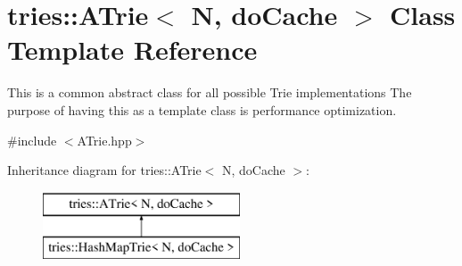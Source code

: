\hypertarget{classtries_1_1_a_trie}{}\section{tries\+:\+:A\+Trie$<$ N, do\+Cache $>$ Class Template Reference}
\label{classtries_1_1_a_trie}


This is a common abstract class for all possible Trie implementations The purpose of having this as a template class is performance optimization.  




{\ttfamily \#include $<$A\+Trie.\+hpp$>$}

Inheritance diagram for tries\+:\+:A\+Trie$<$ N, do\+Cache $>$\+:\begin{figure}[H]
\begin{center}
\leavevmode
\includegraphics[height=2.000000cm]{classtries_1_1_a_trie}
\end{center}
\end{figure}
